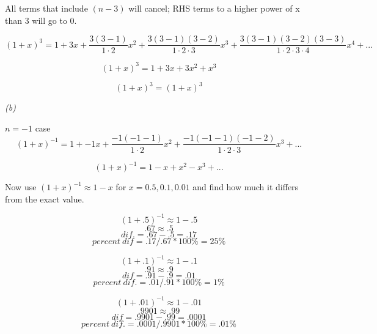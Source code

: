 \documentclass[a4paper, 12pt]{article}
\numberwithin{equation}{section}
\begin{document}
All terms that include $(n-3)$ will cancel; RHS terms to a higher power of x than 3 will go to 0.

\begin{equation}
    ( 1 + x)^3 = 1 + 3x + \frac{3( 3 - 1  )} {1 \cdot{ 2}} x^2 + \frac{3( 3 - 1  ) ( 3 - 2)} {1 \cdot{2} \cdot{3}} x^3 +  \frac{3(3-1)(3-2)(3-3)} {1\cdot{2}\cdot{3}\cdot{4}} x^4
    + ...
\end{equation}

\begin{equation}
    ( 1 + x)^3 = 1 + 3x + 3 x^2 + x^3
\end{equation}

\begin{equation}
    \boxed{( 1 + x)^3 = ( 1 + x)^3}
\end{equation}

\emph{(b)}

$n=-1$
case
\begin{equation}
  ( 1 + x)^{-1} = 1 + -1x + \frac{-1( -1 - 1  )} {1 \cdot{ 2}} x^2 + \frac{-1( -1 - 1  ) ( -1 - 2)} {1 \cdot{2} \cdot{3}} x^3 + ...
\end{equation}

\begin{equation}
  \boxed{( 1 + x)^{-1} = 1 - x + x^2 - x^3 + ...}
\end{equation}

Now use
$( 1 + x)^{-1} \approx{1 - x}$
for
$x =0.5, 0.1, 0.01$
and find how much it differs from the exact value.

\begin{equation}
( 1 + .5)^{-1} \approx{1 - .5}
\end{equation}
\begin{equation}
.67 \approx{.5}
\end{equation}
\begin{equation}
dif. = .67 - .5 = .17
\end{equation}
\begin{equation}
\boxed { percent\:dif = .17 / .67 * 100\% = 25\% }
\end{equation}

\begin{equation}
( 1 + .1)^{-1} \approx{1 - .1}
\end{equation}
\begin{equation}
.91 \approx{.9}
\end{equation}
\begin{equation}
dif = .91 - .9 = .01
\end{equation}
\begin{equation}
\boxed { percent\:dif. = .01 / .91 * 100\% = 1\% }
\end{equation}

\begin{equation}
( 1 + .01)^{-1} \approx{1 - .01}
\end{equation}
\begin{equation}
.9901 \approx{.99}
\end{equation}
\begin{equation}
dif = .9901  - .99 = .0001
\end{equation}
\begin{equation}
\boxed { percent\:dif. = .0001 / .9901 * 100\% = .01\% }
\end{equation}
\end{document}
